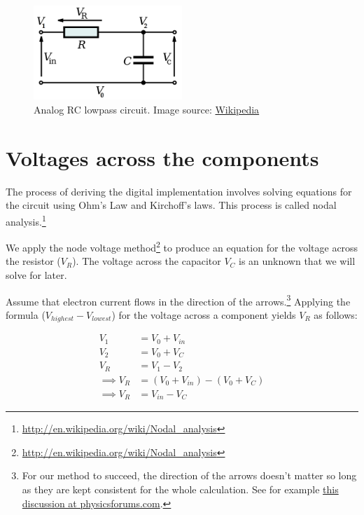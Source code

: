 \documentclass{article}
\begin{document}
\begin{figure}[here]
	\centering
	\includegraphics[width=0.5\textwidth]{images/1280px-RC_Series_Filter.png}
	\caption{Analog RC lowpass circuit. 
		Image source: {\href{https://en.wikipedia.org/wiki/File:RC_Series_Filter_(with_V&I_Labels).svg}{Wikipedia}}}
	\label{fig:RC-lowpass-circuit}
\end{figure}


\section{Voltages across the components}

The process of deriving the digital implementation involves solving equations for
the circuit using Ohm's Law and Kirchoff's laws. This process is called nodal analysis.\footnote{\url{http://en.wikipedia.org/wiki/Nodal_analysis}}

We apply the node voltage method\footnote{\url{http://en.wikipedia.org/wiki/Nodal_analysis}} to produce an equation for the voltage across the resistor ($V_R$). The voltage across the capacitor $V_C$ is an unknown that we will solve for later.

Assume that electron current flows in the direction of the arrows.\footnote{For our method to succeed, the direction of the arrows doesn't matter so long as they are kept consistent for the whole calculation. See for example \href{https://www.physicsforums.com/threads/node-voltage-analysis.246884/}{this discussion at physicsforums.com}.}
Applying the formula ($V_{highest} - V_{lowest}$) for the voltage across a component yields $V_R$ as follows:

\begin{align}
V_1 &= V_0 + V_{in}\\
V_2 &= V_0 + V_C\\
V_R &= V_1 - V_2\\
\implies V_R &= (V_0 + V_{in}) - (V_0 + V_C)\\
\label{eqn:V_R}
\implies V_R &= V_{in} - V_C
\end{align}
\end{document}
